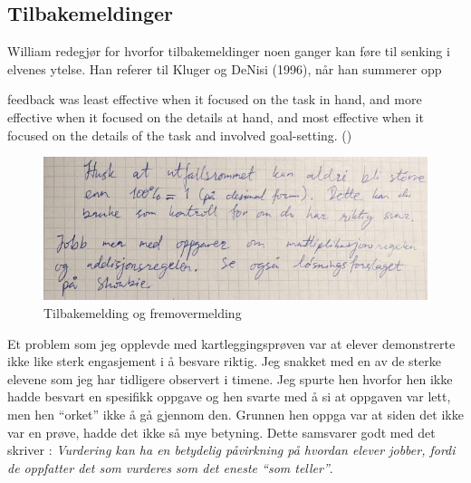 \documentclass[main.tex]{subfiles}
\begin{document}
\subsection*{Tilbakemeldinger}

William redegjør for hvorfor tilbakemeldinger noen ganger kan føre til senking 
i elvenes ytelse. Han referer til Kluger og DeNisi (1996), når han summerer opp 
\begin{displayquote}
\textelp{} feedback was least effective when it focused on the task in hand, 
and more effective when it focused on the details at hand, and most effective 
when it focused on the details of the task and involved goal-setting.
()
\end{displayquote}

\begin{figure}
\centering
\includegraphics[scale = 0.4]{../figures/mohsin2.png}
\caption{Tilbakemelding og fremovermelding}
\label{fig:mohsin2}
\end{figure}

Et problem som jeg opplevde med kartleggingsprøven var at elever demonstrerte ikke like sterk engasjement
i å besvare riktig. Jeg snakket med en av de sterke elevene som jeg har tidligere observert i timene.
Jeg spurte hen hvorfor hen ikke hadde besvart en spesifikk oppgave og hen svarte med å si at oppgaven 
var lett, men hen ``orket'' ikke å gå gjennom den. Grunnen hen oppga var at siden det ikke var en prøve,
hadde det ikke så mye betyning. Dette samsvarer godt med det  skriver : \emph{Vurdering 
kan ha en betydelig påvirkning på hvordan elever jobber, fordi de oppfatter det som vurderes som det eneste
``som teller''}.
\end{document}
